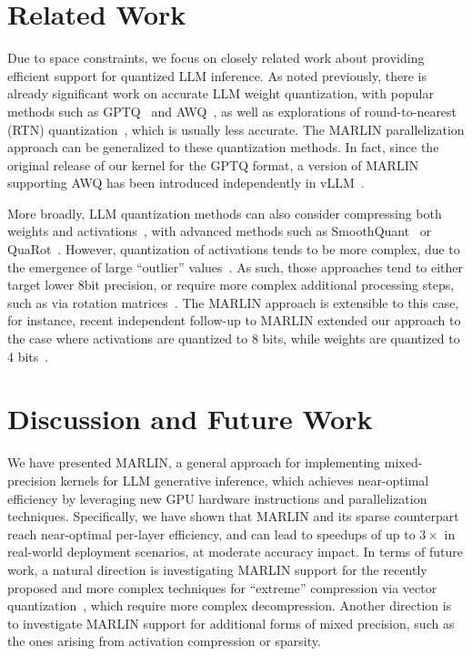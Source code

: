 \documentclass{article}
\theoremstyle{plain}
\theoremstyle{definition}
\theoremstyle{remark}
\begin{document}
\section{Related Work}

Due to space constraints, we focus on closely related work about providing efficient support for quantized LLM inference. As noted previously, there is already significant work on accurate LLM weight quantization, with popular methods such as GPTQ~\cite{frantar2022gptq} and AWQ~\cite{lin2023awq}, as well as explorations of round-to-nearest (RTN) quantization~\cite{dettmers2022case}, which is usually less accurate. 
The MARLIN parallelization approach can be generalized to these quantization methods. In fact, since the original release of our kernel for the GPTQ format, a version of MARLIN supporting AWQ has been introduced independently in vLLM~\cite{vllm-awq-marlin}.  

More broadly, LLM quantization methods can also consider compressing both weights and activations~\cite{dettmers2022llm}, with advanced methods such as SmoothQuant~\cite{xiao2022smoothquant} or QuaRot~\cite{ashkboos2024quarot}. However, quantization of activations tends to be more complex, due to the emergence of large ``outlier'' values~\cite{dettmers2022llm}. 
As such, those approaches tend to either target lower 8bit precision, or require more complex additional processing steps, such as via rotation matrices~\cite{ashkboos2024quarot}. 
The MARLIN approach is extensible to this case, for instance, recent independent follow-up to MARLIN extended our approach to the case where activations are quantized to 8 bits, while weights are quantized to 4 bits~\cite{zhang2024qqq}. 


\section{Discussion and Future Work} 

We have presented MARLIN, a general approach for implementing  mixed-precision kernels for LLM generative inference, which achieves near-optimal efficiency by leveraging new GPU hardware instructions and parallelization techniques. 
Specifically, we have shown that MARLIN and its sparse counterpart reach near-optimal per-layer efficiency, and can lead to speedups of up to $3\times$ in real-world deployment scenarios, at moderate accuracy impact. 
In terms of future work, a natural direction is  investigating MARLIN support for the recently proposed and more complex techniques for ``extreme'' compression via vector quantization~\cite{chee2023quip, egiazarian2024extreme}, which require more complex decompression. Another direction is to investigate MARLIN support for additional forms of mixed precision, such as the ones arising from activation compression or sparsity.
\end{document}
